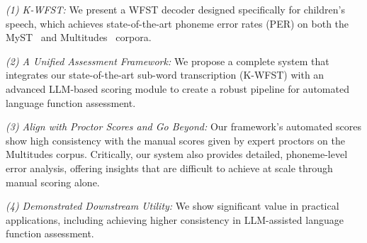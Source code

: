 \textit{(1) K-WFST:} We present a WFST decoder designed specifically for children’s speech, which achieves state-of-the-art phoneme error rates (PER) on both the MyST~\cite{ward2011my} and Multitudes~\cite{UCSFMultitudes2025} corpora.

\textit{(2) A Unified Assessment Framework:} We propose a complete system that integrates our state-of-the-art sub-word transcription (K-WFST) with an advanced LLM-based scoring module to create a robust pipeline for automated language function assessment.

\textit{(3) Align with Proctor Scores and Go Beyond:} Our framework's automated scores show high consistency with the manual scores given by expert proctors on the Multitudes corpus. Critically, our system also provides detailed, phoneme-level error analysis, offering insights that are difficult to achieve at scale through manual scoring alone.

\textit{(4) Demonstrated Downstream Utility:} We show significant value in practical applications, including achieving higher consistency in LLM-assisted language function assessment.
